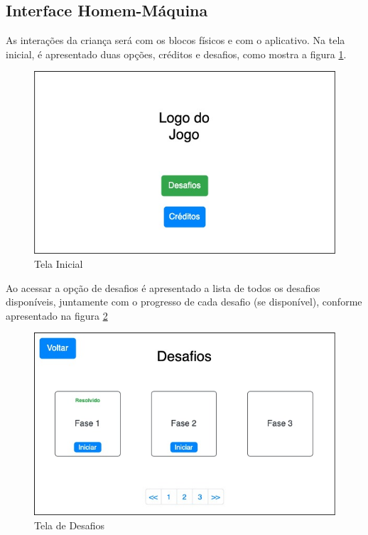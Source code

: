     \subsection{Interface Homem-Máquina}
    As interações da criança será com os blocos físicos e com o aplicativo.
    Na tela inicial, é apresentado duas opções, créditos e desafios, como mostra a figura \ref{figura:tela_inicial}.
    
    \begin{figure}[H]
        \caption{Tela Inicial}
        \begin{center}
            \includegraphics[width=\linewidth]{Imagens/cap3/Tela Inicial.jpg}
        \end{center}
        \label{figura:tela_inicial}
    \end{figure}
    
    Ao acessar a opção de desafios é apresentado a lista de todos os desafios disponíveis, juntamente com o progresso de cada desafio (se disponível), conforme apresentado na figura \ref{figura:tela_desafios}
    
    \begin{figure}[H]
        \caption{Tela de Desafios}
        \begin{center}
            \includegraphics[width=\linewidth]{Imagens/cap3/tela_desafios.jpg}
        \end{center}
        \label{figura:tela_desafios}
    \end{figure}
    
